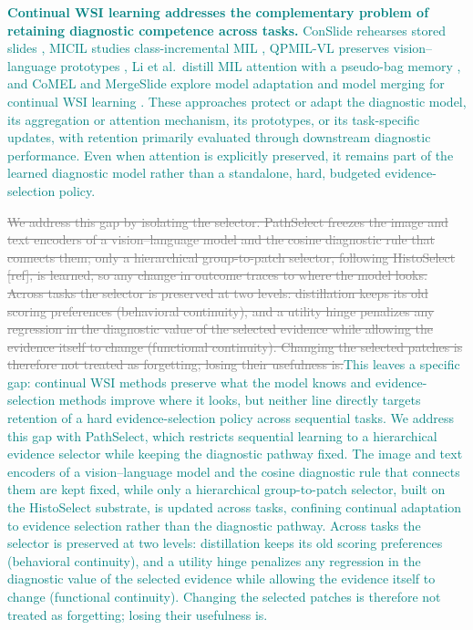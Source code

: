 \documentclass{article}
\newif\ifmarkup \markuptrue
\newcommand{\repc}[3]{\ifmarkup\textcolor{gray}{\sout{#2}}\textcolor{#1}{#3}\else#3\fi}
\newcommand{\repG}[2]{\repc{teal}{#1}{#2}}    %
\begin{document}
\repG{}{\textbf{Continual WSI learning addresses the complementary problem of retaining diagnostic competence across tasks.} ConSlide rehearses stored slides \cite{huang2023conslide}, MICIL studies class-incremental MIL \cite{meseguer2024micil}, QPMIL-VL preserves vision--language prototypes \cite{gou2025qpmil}, Li et al.\ distill MIL attention with a pseudo-bag memory \cite{li2025akd}, and CoMEL and MergeSlide explore model adaptation and model merging for continual WSI learning \cite{lee2025comel,bui2026mergeslide}. These approaches protect or adapt the diagnostic model, its aggregation or attention mechanism, its prototypes, or its task-specific updates, with retention primarily evaluated through downstream diagnostic performance. Even when attention is explicitly preserved, it remains part of the learned diagnostic model rather than a standalone, hard, budgeted evidence-selection policy.}

\repG{We address this gap by isolating the selector. PathSelect freezes the image and text encoders of a vision--language model and the cosine diagnostic rule that connects them; only a hierarchical group-to-patch selector, following HistoSelect [ref], is learned, so any change in outcome traces to where the model looks. Across tasks the selector is preserved at two levels: distillation keeps its old scoring preferences (behavioral continuity), and a utility hinge penalizes any regression in the diagnostic value of the selected evidence while allowing the evidence itself to change (functional continuity). Changing the selected patches is therefore not treated as forgetting; losing their usefulness is.}{This leaves a specific gap: continual WSI methods preserve what the model knows and evidence-selection methods improve where it looks, but neither line directly targets retention of a hard evidence-selection policy across sequential tasks. We address this gap with PathSelect, which restricts sequential learning to a hierarchical evidence selector while keeping the diagnostic pathway fixed. The image and text encoders of a vision--language model and the cosine diagnostic rule that connects them are kept fixed, while only a hierarchical group-to-patch selector, built on the HistoSelect substrate, is updated across tasks, confining continual adaptation to evidence selection rather than the diagnostic pathway. Across tasks the selector is preserved at two levels: distillation keeps its old scoring preferences (behavioral continuity), and a utility hinge penalizes any regression in the diagnostic value of the selected evidence while allowing the evidence itself to change (functional continuity). Changing the selected patches is therefore not treated as forgetting; losing their usefulness is.}
\end{document}
